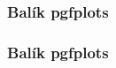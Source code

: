 \subsubsection{Balík pgfplots}
\begin{frame}
	\frametitle{Balík pgfplots}
	\UnderConstruction
\end{frame}

\endinput
